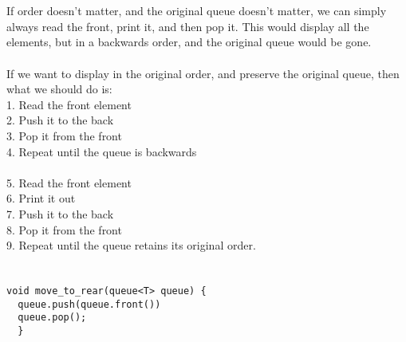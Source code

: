 \documentclass[12pt]{article}
\begin{document}
\section{}
If order doesn't matter, and the original queue doesn't matter, we can simply always read the front, print it, and then pop it. This would display all the elements, but in a backwards order, and the original queue would be gone.\\
\\
If we want to display in the original order, and preserve the original queue, then what we should do is: \\
1. Read the front element\\
2. Push it to the back\\
3. Pop it from the front\\
4. Repeat until the queue is backwards\\
\\
5. Read the front element\\
6. Print it out\\
7. Push it to the back\\
8. Pop it from the front\\
9. Repeat until the queue retains its original order.
\section{}
\begin{verbatim}
void move_to_rear(queue<T> queue) {
  queue.push(queue.front())
  queue.pop();
  }
\end{verbatim}
\end{document}
